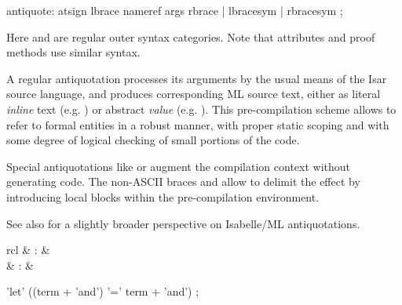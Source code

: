 \begin{isabellebody}
\begin{isamarkuptext}
  \begin{rail}
  antiquote: atsign lbrace nameref args rbrace | lbracesym | rbracesym
  ;
  \end{rail}

  Here \hyperlink{syntax.nameref}{\mbox{}} and \hyperlink{syntax.args}{\mbox{}} are regular outer syntax
  categories.  Note that attributes and proof methods use similar
  syntax.

  \medskip A regular antiquotation  processes
  its arguments by the usual means of the Isar source language, and
  produces corresponding ML source text, either as literal
  \emph{inline} text (e.g. ) or abstract
  \emph{value} (e.g. ).  This pre-compilation
  scheme allows to refer to formal entities in a robust manner, with
  proper static scoping and with some degree of logical checking of
  small portions of the code.

  Special antiquotations like  or  augment the compilation context without generating code.  The
  non-ASCII braces \isa{{\isasymlbrace}} and \isa{{\isasymrbrace}} allow to delimit the
  effect by introducing local blocks within the pre-compilation
  environment.

  \medskip See also \cite{Wenzel-Chaieb:2007b} for a slightly broader
  perspective on Isabelle/ML antiquotations.%
\end{isamarkuptext}%
\isamarkuptrue%
%
\isadelimmlantiq
%
\endisadelimmlantiq
%
\isatagmlantiq
%
\begin{isamarkuptext}%
\begin{matharray}{rcl}
  \hypertarget{ML antiquotation.let}{\hyperlink{ML antiquotation.let}{\mbox{}}} & : &  \\
  \hypertarget{ML antiquotation.note}{\hyperlink{ML antiquotation.note}{\mbox{}}} & : &  \\
  \end{matharray}

  \begin{rail}
  'let' ((term + 'and') '=' term + 'and')
  ;


\end{rail}
\end{isamarkuptext}
\end{isabellebody}
